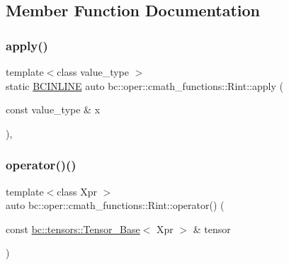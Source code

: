 \subsection{Member Function Documentation}
\mbox{\label{structbc_1_1oper_1_1cmath__functions_1_1Rint_aa8d0d7b3475cde268d43a3c8c3ff7060}} 
\subsubsection{\texorpdfstring{apply()}{apply()}}
{\footnotesize\ttfamily template$<$class value\+\_\+type $>$ \\
static \hyperlink{common_8h_a6699e8b0449da5c0fafb878e59c1d4b1}{B\+C\+I\+N\+L\+I\+NE} auto bc\+::oper\+::cmath\+\_\+functions\+::\+Rint\+::apply (\begin{DoxyParamCaption}\item[{const value\+\_\+type \&}]{x }\end{DoxyParamCaption})\hspace{0.3cm}{\ttfamily [inline]}, {\ttfamily [static]}}

\mbox{\label{structbc_1_1oper_1_1cmath__functions_1_1Rint_a6d65617f1f0fe7920b4df83cef71ce82}} 
\subsubsection{\texorpdfstring{operator()()}{operator()()}\hspace{0.1cm}{\footnotesize\ttfamily [1/3]}}
{\footnotesize\ttfamily template$<$class Xpr $>$ \\
auto bc\+::oper\+::cmath\+\_\+functions\+::\+Rint\+::operator() (\begin{DoxyParamCaption}\item[{const \hyperlink{classbc_1_1tensors_1_1Tensor__Base}{bc\+::tensors\+::\+Tensor\+\_\+\+Base}$<$ Xpr $>$ \&}]{tensor }\end{DoxyParamCaption})\hspace{0.3cm}{\ttfamily [inline]}}

